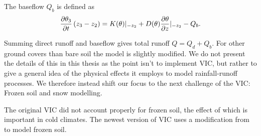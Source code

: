 The baseflow $Q_b$ is defined as \cite{VIC2L}
\begin{equation}
    \pdv{\theta_3}{t} \left(z_3 - z_2\right) = K(\theta)|_{-z_2} + D(\theta)
    \pdv{\theta}{z}|_{-z_2} - Q_b. \label{Qb}
\end{equation}

Summing direct runoff and baseflow gives total runoff $Q=Q_d + Q_b$. For other ground covers 
than bare soil the model is slightly modified. We do not present the details of 
this in this thesis as the point isn't to implement VIC, but rather to give a general 
idea of the physical effects it employs to model rainfall-runoff processes. We therefore 
instead shift our focus to the next challenge of the VIC: Frozen soil and snow modelling.

The original VIC did not account 
properly for frozen soil, the effect of which is important in cold climates.
The newest version of VIC \cite{VIC5} uses a modification from \cite{VICFrozenSoil}
to model frozen soil. 

